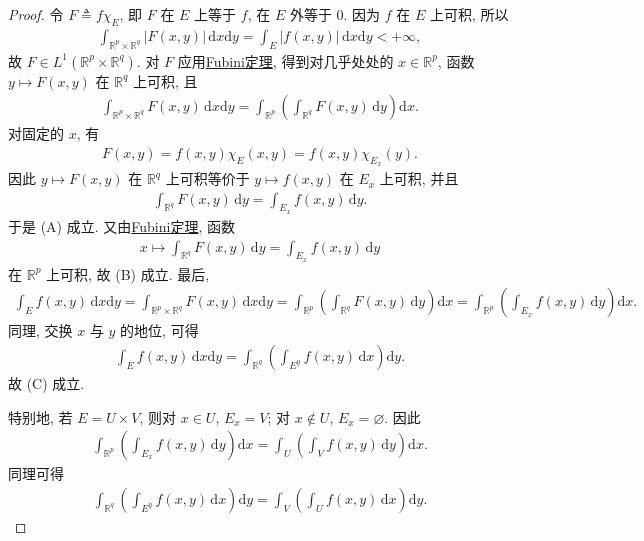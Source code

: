 \documentclass[../../main.tex]{subfiles}%
\begin{document}
\begin{proof}

令 \(F\triangleq f\chi_E\), 即 \(F\) 在 \(E\) 上等于 \(f\), 在 \(E\) 外等于 \(0\). 因为 \(f\) 在 \(E\) 上可积, 所以
\begin{align*}
\int_{\mathbb{R}^p\times\mathbb{R}^q} |F(x,y)|\,\mathrm{d}x\mathrm{d}y
=\int_E |f(x,y)|\,\mathrm{d}x\mathrm{d}y<+\infty,
\end{align*}
故 \(F\in L^1(\mathbb{R}^p\times\mathbb{R}^q)\). 对 \(F\) 应用\hyperref[theorem:实变函数Rn-Fubini定理]{Fubini定理}, 得到对几乎处处的 \(x\in\mathbb{R}^p\), 函数 \(y\mapsto F(x,y)\) 在 \(\mathbb{R}^q\) 上可积, 且
\begin{align*}
\int_{\mathbb{R}^p\times\mathbb{R}^q} F(x,y)\,\mathrm{d}x\mathrm{d}y
=\int_{\mathbb{R}^p}\left(\int_{\mathbb{R}^q}F(x,y)\,\mathrm{d}y\right)\mathrm{d}x.
\end{align*}
对固定的 \(x\), 有
\begin{align*}
F(x,y)=f(x,y)\chi_E(x,y)=f(x,y)\chi_{E_x}(y).
\end{align*}
因此 \(y\mapsto F(x,y)\) 在 \(\mathbb{R}^q\) 上可积等价于 \(y\mapsto f(x,y)\) 在 \(E_x\) 上可积, 并且
\begin{align*}
\int_{\mathbb{R}^q}F(x,y)\,\mathrm{d}y
=\int_{E_x} f(x,y)\,\mathrm{d}y.
\end{align*}
于是 (A) 成立. 又由\hyperref[theorem:实变函数Rn-Fubini定理]{Fubini定理}, 函数
\begin{align*}
x\mapsto\int_{\mathbb{R}^q}F(x,y)\,\mathrm{d}y
=\int_{E_x} f(x,y)\,\mathrm{d}y
\end{align*}
在 \(\mathbb{R}^p\) 上可积, 故 (B) 成立. 最后,
\begin{align*}
\int_E f(x,y)\,\mathrm{d}x\mathrm{d}y
=\int_{\mathbb{R}^p\times\mathbb{R}^q} F(x,y)\,\mathrm{d}x\mathrm{d}y
=\int_{\mathbb{R}^p}\left(\int_{\mathbb{R}^q}F(x,y)\,\mathrm{d}y\right)\mathrm{d}x
=\int_{\mathbb{R}^p}\left(\int_{E_x} f(x,y)\,\mathrm{d}y\right)\mathrm{d}x.
\end{align*}
同理, 交换 \(x\) 与 \(y\) 的地位, 可得
\begin{align*}
\int_E f(x,y)\,\mathrm{d}x\mathrm{d}y
=\int_{\mathbb{R}^q}\left(\int_{E^y} f(x,y)\,\mathrm{d}x\right)\mathrm{d}y.
\end{align*}
故 (C) 成立.

特别地, 若 \(E=U\times V\), 则对 \(x\in U\), \(E_x=V\); 对 \(x\notin U\), \(E_x=\varnothing\). 因此
\begin{align*}
\int_{\mathbb{R}^p}\left(\int_{E_x} f(x,y)\,\mathrm{d}y\right)\mathrm{d}x
=\int_U\left(\int_V f(x,y)\,\mathrm{d}y\right)\mathrm{d}x.
\end{align*}
同理可得
\begin{align*}
\int_{\mathbb{R}^q}\left(\int_{E^y} f(x,y)\,\mathrm{d}x\right)\mathrm{d}y
=\int_V\left(\int_U f(x,y)\,\mathrm{d}x\right)\mathrm{d}y.
\end{align*}
\end{proof}
\end{document}
